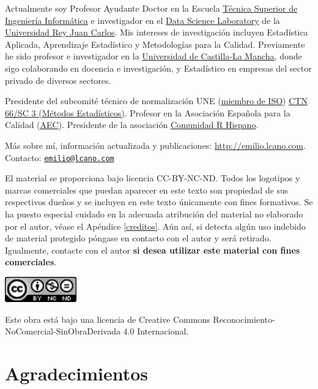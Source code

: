 \documentclass[
]{book}
\begin{document}
Actualmente soy Profesor Ayudante Doctor en la Escuela \href{https://www.urjc.es/etsii}{Técnica Superior de Ingeniería Informática} e investigador en el \href{http://www.datasciencelab.es}{Data Science Laboratory} de la \href{https://www.urjc.es}{Universidad Rey Juan Carlos}. Mis intereses de investigación incluyen Estadística Aplicada, Aprendizaje Estadístico y Metodologías para la Calidad. Previamente he sido profesor e investigador en la \href{https://www.uclm.es}{Universidad de Castilla-La Mancha}, donde sigo colaborando en docencia e investigación, y Estadístico en empresas del sector privado de diversos sectores.

Presidente del subcomité técnico de normalización UNE (\href{https://www.iso.org/committee/49742/x/catalogue/}{miembro de ISO}) \href{https://www.une.org/encuentra-tu-norma/comites-tecnicos-de-normalizacion/comite/?c=CTN\%2066/SC\%203}{CTN 66/SC 3 (Métodos Estadísticos)}. Profesor en la Asociación Española para la Calidad (\href{https://www.aec.es}{AEC}). Presidente de la asociación \href{http://r-es.org}{Comunidad R Hispano}.

Más sobre mí, información actualizada y publicaciones: \url{http://emilio.lcano.com}.\\
Contacto: \href{mailto:emilio@lcano.com}{\nolinkurl{emilio@lcano.com}}

El material se proporciona bajo licencia CC-BY-NC-ND.
Todos los logotipos y marcas comerciales que puedan aparecer en este texto
son propiedad de sus respectivos dueños y se incluyen en este texto únicamente
con fines formativos. Se ha puesto especial cuidado en la adecuada atribución
del material no elaborado por el autor, véase el Apéndice \ref{creditos}.
Aún así, si detecta algún uso
indebido de material protegido póngase en contacto con el autor y será retirado.
Igualmente, contacte con el autor \textbf{si desea utilizar este material con fines
comerciales}.

\includegraphics[width=1.22in]{images/by-nc-nd}

Este obra está bajo una licencia de Creative Commons Reconocimiento-NoComercial-SinObraDerivada 4.0 Internacional.

\hypertarget{agradecimientos}{%
\section*{Agradecimientos}\label{agradecimientos}}
\end{document}
